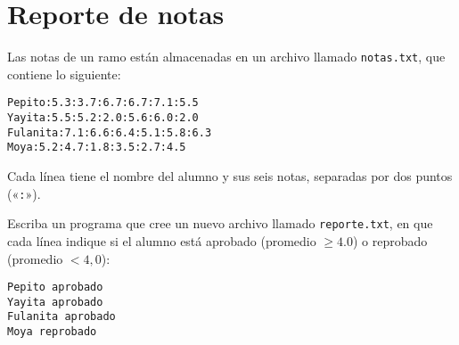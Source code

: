 \section{Reporte de notas}

Las notas de un ramo están almacenadas en un archivo llamado
\lstinline!notas.txt!, que contiene lo siguiente:
\begin{lstlisting}[language=file]
Pepito:5.3:3.7:6.7:6.7:7.1:5.5
Yayita:5.5:5.2:2.0:5.6:6.0:2.0
Fulanita:7.1:6.6:6.4:5.1:5.8:6.3
Moya:5.2:4.7:1.8:3.5:2.7:4.5
\end{lstlisting}

Cada línea tiene el nombre del alumno y sus seis notas, separadas por
dos puntos («\lstinline!:!»).

Escriba un programa que cree un nuevo archivo llamado
\lstinline!reporte.txt!, en que cada línea indique si el alumno está
aprobado (promedio \(\ge 4.0\)) o reprobado (promedio \(< 4,0\)):
\begin{lstlisting}
Pepito aprobado
Yayita aprobado
Fulanita aprobado
Moya reprobado
\end{lstlisting}


